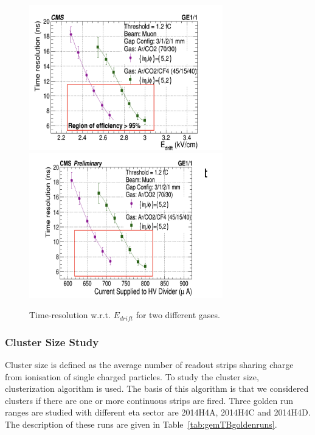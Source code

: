 \begin{figure}[!htbp]
\centering
\includegraphics[width=0.75\textwidth]{figures/GEM/TimeResolution_Edrift.jpeg}\\
\includegraphics[width=0.75\textwidth]{figures/GEM/TimeResolution_Current.jpeg}\\
\caption{Time-resolution w.r.t. $E_{drift}$ for two different gases.}
\label{TimeResolution}
\end{figure}



\subsubsection{Cluster Size Study}

Cluster size is defined as the average number of readout strips sharing charge from ionisation of single charged particles.
To study the cluster size, clusterization algorithm is used. The basis of this algorithm is that we considered clusters if there are one or more continuous strips are fired.
Three golden run ranges are studied with different eta sector are 2014H4A, 2014H4C and 2014H4D.
The description of these runs are given in Table~\ref{tab:gemTBgoldenruns}.

